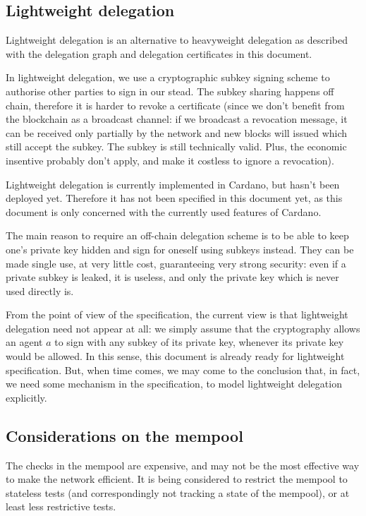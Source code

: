\documentclass{article}
\begin{document}
\subsection{Lightweight delegation}
\label{sec:lightweight-delegation}

Lightweight delegation is an alternative to heavyweight delegation as
described with the delegation graph and delegation certificates in
this document.

In lightweight delegation, we use a cryptographic subkey signing
scheme to authorise other parties to sign in our stead. The subkey
sharing happens off chain, therefore it is harder to revoke a
certificate (since we don't benefit from the blockchain as a broadcast
channel: if we broadcast a revocation message, it can be received only
partially by the network and new blocks will issued which still accept
the subkey. The subkey is still technically valid. Plus, the economic
insentive probably don't apply, and make it costless to ignore a
revocation).

Lightweight delegation is currently implemented in Cardano, but hasn't
been deployed yet. Therefore it has not been specified in this
document yet, as this document is only concerned with the currently
used features of Cardano.

The main reason to require an off-chain delegation scheme is to be
able to keep one's private key hidden and sign for oneself using
subkeys instead. They can be made single use, at very little cost,
guaranteeing very strong security: even if a private subkey is leaked,
it is useless, and only the private key which is never used directly
is.

From the point of view of the specification, the current view is that
lightweight delegation need not appear at all: we simply assume that
the cryptography allows an agent $a$ to sign with any subkey of its
private key, whenever its private key would be allowed. In this sense,
this document is already ready for lightweight specification. But,
when time comes, we may come to the conclusion that, in fact, we need
some mechanism in the specification, to model lightweight delegation
explicitly.

\subsection{Considerations on the mempool}
\label{sec:appendix-mempool}

The checks in the mempool are expensive, and may not be the most
effective way to make the network efficient. It is being considered to
restrict the mempool to stateless tests (and correspondingly not
tracking a state of the mempool), or at least less restrictive tests.
\end{document}
